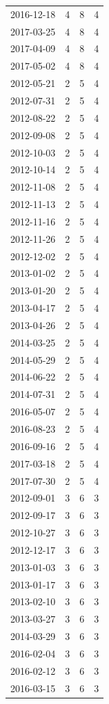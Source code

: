 \begin{tabular}{lrrr}
2016-12-18 & 4 & 8 & 4 \\
2017-03-25 & 4 & 8 & 4 \\
2017-04-09 & 4 & 8 & 4 \\
2017-05-02 & 4 & 8 & 4 \\
2012-05-21 & 2 & 5 & 4 \\
2012-07-31 & 2 & 5 & 4 \\
2012-08-22 & 2 & 5 & 4 \\
2012-09-08 & 2 & 5 & 4 \\
2012-10-03 & 2 & 5 & 4 \\
2012-10-14 & 2 & 5 & 4 \\
2012-11-08 & 2 & 5 & 4 \\
2012-11-13 & 2 & 5 & 4 \\
2012-11-16 & 2 & 5 & 4 \\
2012-11-26 & 2 & 5 & 4 \\
2012-12-02 & 2 & 5 & 4 \\
2013-01-02 & 2 & 5 & 4 \\
2013-01-20 & 2 & 5 & 4 \\
2013-04-17 & 2 & 5 & 4 \\
2013-04-26 & 2 & 5 & 4 \\
2014-03-25 & 2 & 5 & 4 \\
2014-05-29 & 2 & 5 & 4 \\
2014-06-22 & 2 & 5 & 4 \\
2014-07-31 & 2 & 5 & 4 \\
2016-05-07 & 2 & 5 & 4 \\
2016-08-23 & 2 & 5 & 4 \\
2016-09-16 & 2 & 5 & 4 \\
2017-03-18 & 2 & 5 & 4 \\
2017-07-30 & 2 & 5 & 4 \\
2012-09-01 & 3 & 6 & 3 \\
2012-09-17 & 3 & 6 & 3 \\
2012-10-27 & 3 & 6 & 3 \\
2012-12-17 & 3 & 6 & 3 \\
2013-01-03 & 3 & 6 & 3 \\
2013-01-17 & 3 & 6 & 3 \\
2013-02-10 & 3 & 6 & 3 \\
2013-03-27 & 3 & 6 & 3 \\
2014-03-29 & 3 & 6 & 3 \\
2016-02-04 & 3 & 6 & 3 \\
2016-02-12 & 3 & 6 & 3 \\
2016-03-15 & 3 & 6 & 3 \\

\end{tabular}

